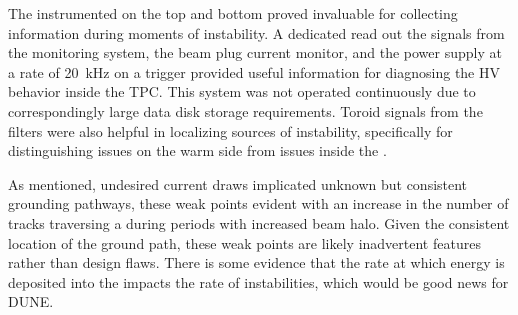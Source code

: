 
The instrumented  on the top and bottom  proved invaluable for collecting information during moments of instability.
A dedicated  read out the signals from the  monitoring system, the beam plug current monitor, and the power supply at a rate of \SI{20}{kHz} on a trigger provided useful information for diagnosing the HV behavior inside the TPC.
This system was not operated continuously due to correspondingly large data disk storage requirements.
Toroid signals from the  filters were also helpful in localizing sources of instability, specifically for distinguishing issues on the warm side from issues inside the .

As mentioned, undesired current draws implicated unknown but consistent grounding pathways, these weak points evident with an increase in the number of tracks traversing a  during periods with increased beam halo.  Given the consistent location of the ground path, these weak points are likely inadvertent features rather than design flaws. There is some evidence that the rate at which energy is deposited into the  impacts the rate of instabilities, which would be good news for DUNE.  %



